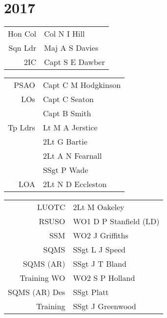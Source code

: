 \chapter*{2017}

\vspace*{10mm}

\begin{center}
  \begin{tabular}{rl}
    Hon Col & Col N I Hill \\
    Sqn Ldr & Maj A S Davies \\
    2IC & Capt S E Dawber \\
  \end{tabular}
\end{center}

\begin{multicols}{2}
  \footnotesize
  \begin{tabular}{rl}
    PSAO & Capt C M Hodgkinson \\
    LOs & Capt C Seaton \\
        & Capt B Smith \\
    Tp Ldrs & Lt M A Jerstice \\
     & 2Lt G Bartie \\
     & 2Lt A N Fearnall \\
     & SSgt P Wade \\
    LOA & 2Lt N D Eccleston \\
  \end{tabular}

  \begin{tabular}{rl}
    LUOTC & 2Lt M Oakeley \\
    RSUSO & WO1 D P Stanfield (LD) \\
    SSM & WO2 J Griffiths \\
    SQMS & SSgt L J Speed \\
    SQMS (AR) & SSgt J T Bland \\
    Training WO & WO2 S P Holland \\
    SQMS (AR) Des & SSgt Platt \\
    Training & SSgt J Greenwood \\
  \end{tabular}
\end{multicols}

